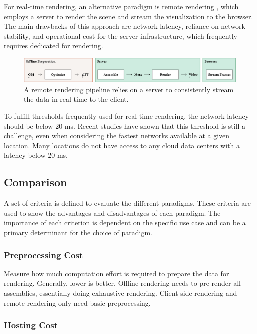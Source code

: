 For real-time rendering, an alternative paradigm is remote rendering \cite{remoteRendering}, which employs a server to render the scene and stream the visualization to the browser. The main drawbacks of this approach are network latency, reliance on network stability, and operational cost for the server infrastructure, which frequently requires dedicated  for rendering.

\begin{figure}[H]
  \includegraphics[width=\columnwidth]{resources/cad-pipeline-remote.png}
  \caption{A remote rendering pipeline relies on a server to consistently stream the data in real-time to the client.}
  \label{fig:cad-remote}
\end{figure}

To fulfill thresholds frequently used for real-time rendering, the network latency should be below 20 ms. Recent studies have shown that this threshold is still a challenge, even when considering the fastest networks available at a given location. Many locations do not have access to any cloud data centers with a latency below 20 ms. \cite{cloudLatency}

\subsection*{Comparison}

A set of criteria is defined to evaluate the different paradigms. These criteria are used to show the advantages and disadvantages of each paradigm. The importance of each criterion is dependent on the specific use case and can be a primary determinant for the choice of paradigm.

\subsubsection{Preprocessing Cost}

Measure how much computation effort is required to prepare the data for rendering. Generally, lower is better. Offline rendering needs to pre-render all assemblies, essentially doing exhaustive rendering. Client-side rendering and remote rendering only need basic preprocessing.

\subsubsection{Hosting Cost}

